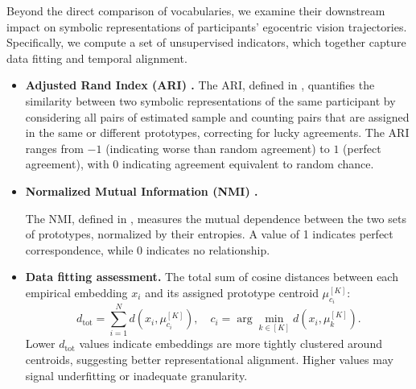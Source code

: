             Beyond the direct comparison of vocabularies, we examine their downstream impact on symbolic representations of participants’ egocentric vision trajectories. Specifically, we compute a set of unsupervised indicators, which together capture data fitting and temporal alignment. 

            \begin{itemize}

                \item \textbf{Adjusted Rand Index (ARI) \cite{Hubert1985}.}  
                The ARI, defined in , quantifies the similarity between two symbolic representations of the same participant by considering all pairs of estimated sample and counting pairs that are assigned in the same or different prototypes, correcting for lucky agreements. The ARI ranges from \(-1\) (indicating worse than random agreement) to \(1\) (perfect agreement), with \(0\) indicating agreement equivalent to random chance.

                \item \textbf{Normalized Mutual Information (NMI) \cite{Lancichinetti2009}.}

                The NMI, defined in , measures the mutual dependence between the two sets of prototypes, normalized by their entropies. A value of 1 indicates perfect correspondence, while 0 indicates no relationship.

                \item \textbf{Data fitting assessment.}  
                The total sum of cosine distances between each empirical embedding $x_i$ and its assigned prototype centroid $\mu_{c_i}^{[K]}$:  
                \[
                    d_\text{tot} = \sum_{i=1}^N d(x_i, \mu^{[K]}_{c_i}), 
                    \quad c_i = \arg \min_{k \in [K]} d(x_i, \mu^{[K]}_k).
                \]  
                Lower $d_\text{tot}$ values indicate embeddings are more tightly clustered around centroids, suggesting better representational alignment. Higher values may signal underfitting or inadequate granularity.  


\end{itemize}
